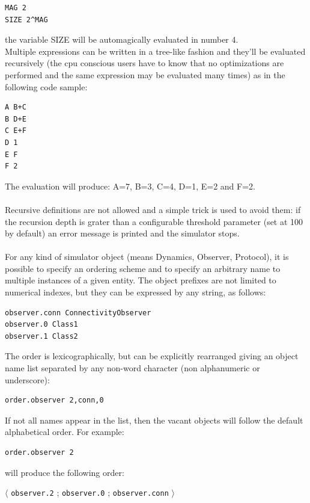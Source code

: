 \documentclass[a4paper,12pt]{article}
\begin{document}
\begin{verbatim}
MAG 2
SIZE 2^MAG
\end{verbatim}

the variable SIZE will be automagically evaluated in number 4.\\
Multiple expressions can be written in a tree-like fashion and they'll
be evaluated recursively (the cpu conscious users have to know that 
no optimizations are performed and the same expression may be evaluated
many times) as in the following code sample:

\begin{verbatim}
A B+C
B D+E
C E+F
D 1
E F
F 2
\end{verbatim}

The evaluation will produce: A=7, B=3, C=4, D=1, E=2 and F=2.\\
\\
Recursive definitions are not allowed and a simple trick is used to 
avoid them: if the recursion depth is grater than a configurable 
threshold parameter (set at 100 by default) an error message is
printed and the simulator stops.\\
\\
For any kind of simulator object (means Dynamics, Observer, Protocol),
it is possible to specify an ordering scheme and to specify an arbitrary 
name to multiple instances of a given entity. The object prefixes are
not limited to numerical indexes, but they can be expressed by any 
string, as follows:

\begin{verbatim}
observer.conn ConnectivityObserver
observer.0 Class1
observer.1 Class2
\end{verbatim}

The order is lexicographically, but can be explicitly rearranged
giving an object name list separated  by any non-word character
(non alphanumeric or underscore):

\begin{verbatim}
order.observer 2,conn,0
\end{verbatim}

If not all names appear in the list,
then the vacant objects will follow the default alphabetical order.
For example:

\begin{verbatim}
order.observer 2
\end{verbatim}

will produce the following order:

\begin{center}
$\langle$ \texttt{observer.2} ; \texttt{observer.0} ; \texttt{observer.conn} $\rangle$
\end{center}
\end{document}
